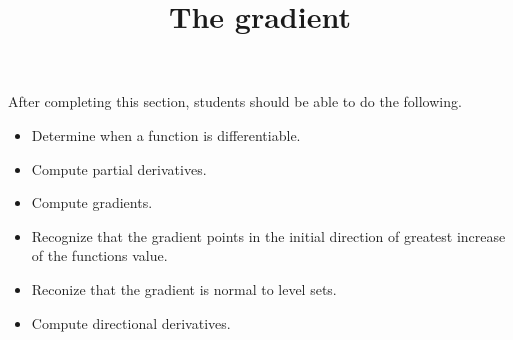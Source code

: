 \documentclass{ximera}
\title{The gradient}
\begin{document}
\begin{abstract}
\end{abstract}

\maketitle

\begin{sectionOutcomes}

After completing this section, students should be able to do the following.

\begin{itemize}
\item Determine when a function is differentiable.
\item Compute partial derivatives.
\item Compute gradients.
\item Recognize that the gradient points in the initial direction of
  greatest increase of the functions value.
\item Reconize that the gradient is normal to level sets.
\item Compute directional derivatives.
\end{itemize}

\end{sectionOutcomes}
\end{document}
